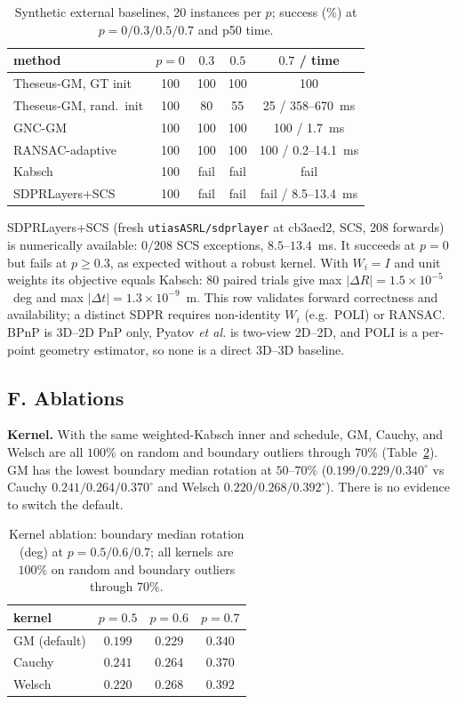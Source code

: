 \begin{table}[t]
\caption{Synthetic external baselines, 20 instances per $p$; success (\%) at $p=0/0.3/0.5/0.7$ and
p50 time.}
\label{tab:baselines}
\centering
\footnotesize
\setlength{\tabcolsep}{3pt}
\begin{tabular}{lcccc}
\toprule
method & $p=0$ & $0.3$ & $0.5$ & $0.7$ / time \\
\midrule
Theseus-GM, GT init & 100 & 100 & 100 & 100 \\
Theseus-GM, rand.\ init & 100 & 80 & 55 & 25 / 358--670~ms \\
GNC-GM & 100 & 100 & 100 & 100 / 1.7~ms \\
RANSAC-adaptive & 100 & 100 & 100 & 100 / 0.2--14.1~ms \\
Kabsch & 100 & fail & fail & fail \\
SDPRLayers+SCS & 100 & fail & fail & fail / 8.5--13.4~ms \\
\bottomrule
\end{tabular}
\end{table}

SDPRLayers+SCS (fresh \texttt{utiasASRL/sdprlayer} at cb3aed2, SCS, 208 forwards) is numerically
available: $0/208$ SCS exceptions, $8.5$--$13.4$~ms. It succeeds at $p=0$ but fails at $p\ge0.3$, as
expected without a robust kernel. With $W_i=I$ and unit weights its objective equals Kabsch: 80
paired trials give max $|\Delta R|=1.5\times10^{-5}$~deg and max $|\Delta t|=1.3\times10^{-9}$~m.
This row validates forward correctness and availability; a distinct SDPR requires non-identity
$W_i$ (e.g.\ POLI) or RANSAC. BPnP is 3D--2D PnP only, Pyatov \emph{et al.} is two-view 2D--2D, and
POLI is a per-point geometry estimator, so none is a direct 3D--3D baseline.

\subsection*{F. Ablations}
\label{app:ablations}

\noindent\textbf{Kernel.} With the same weighted-Kabsch inner and schedule, GM, Cauchy, and Welsch
are all $100\%$ on random and boundary outliers through $70\%$ (Table~\ref{tab:kernelabl}). GM has
the lowest boundary median rotation at $50$--$70\%$ ($0.199/0.229/0.340^\circ$ vs Cauchy
$0.241/0.264/0.370^\circ$ and Welsch $0.220/0.268/0.392^\circ$). There is no evidence to switch the
default.

\begin{table}[t]
\caption{Kernel ablation: boundary median rotation (deg) at $p=0.5/0.6/0.7$; all kernels are
$100\%$ on random and boundary outliers through $70\%$.}
\label{tab:kernelabl}
\centering
\footnotesize
\setlength{\tabcolsep}{4pt}
\begin{tabular}{lccc}
\toprule
kernel & $p=0.5$ & $p=0.6$ & $p=0.7$ \\
\midrule
GM (default) & $0.199$ & $0.229$ & $0.340$ \\
Cauchy & $0.241$ & $0.264$ & $0.370$ \\
Welsch & $0.220$ & $0.268$ & $0.392$ \\
\bottomrule
\end{tabular}
\end{table}


